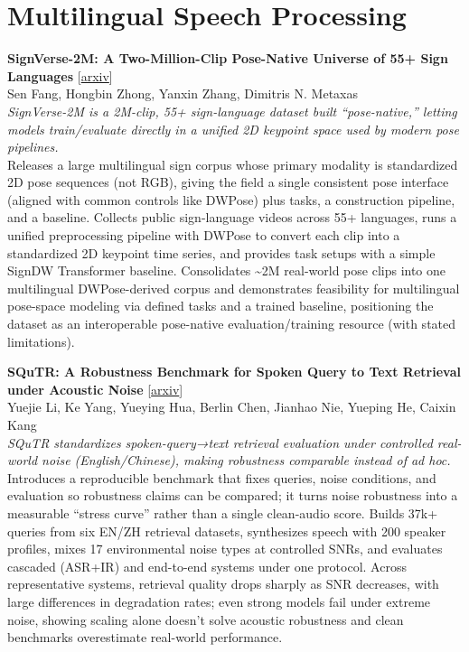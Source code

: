 \documentclass[12pt,letterpaper]{article}
\begin{document}
\medskip


\section*{Multilingual Speech Processing}

{\small\textbf{SignVerse-2M: A Two-Million-Clip Pose-Native Universe of 55+ Sign Languages}} {\scriptsize[\href{https://arxiv.org/abs/2605.01720}{arxiv}]}\\
{\scriptsize Sen Fang, Hongbin Zhong, Yanxin Zhang, Dimitris N. Metaxas}\\

{\small\textit{SignVerse-2M is a 2M-clip, 55+ sign-language dataset built ``pose-native,'' letting models train/evaluate directly in a unified 2D keypoint space used by modern pose pipelines.}}\\[1pt]
{\footnotesize Releases a large multilingual sign corpus whose primary modality is standardized 2D pose sequences (not RGB), giving the field a single consistent pose interface (aligned with common controls like DWPose) plus tasks, a construction pipeline, and a baseline. Collects public sign-language videos across 55+ languages, runs a unified preprocessing pipeline with DWPose to convert each clip into a standardized 2D keypoint time series, and provides task setups with a simple SignDW Transformer baseline. Consolidates \textasciitilde{}2M real-world pose clips into one multilingual DWPose-derived corpus and demonstrates feasibility for multilingual pose-space modeling via defined tasks and a trained baseline, positioning the dataset as an interoperable pose-native evaluation/training resource (with stated limitations).}

\medskip

{\small\textbf{SQuTR: A Robustness Benchmark for Spoken Query to Text Retrieval under Acoustic Noise}} {\scriptsize[\href{https://arxiv.org/abs/2602.12783}{arxiv}]}\\
{\scriptsize Yuejie Li, Ke Yang, Yueying Hua, Berlin Chen, Jianhao Nie, Yueping He, Caixin Kang}\\

{\small\textit{SQuTR standardizes spoken-query→text retrieval evaluation under controlled real-world noise (English/Chinese), making robustness comparable instead of ad hoc.}}\\[1pt]
{\footnotesize Introduces a reproducible benchmark that fixes queries, noise conditions, and evaluation so robustness claims can be compared; it turns noise robustness into a measurable ``stress curve'' rather than a single clean-audio score. Builds 37k+ queries from six EN/ZH retrieval datasets, synthesizes speech with 200 speaker profiles, mixes 17 environmental noise types at controlled SNRs, and evaluates cascaded (ASR+IR) and end-to-end systems under one protocol. Across representative systems, retrieval quality drops sharply as SNR decreases, with large differences in degradation rates; even strong models fail under extreme noise, showing scaling alone doesn't solve acoustic robustness and clean benchmarks overestimate real-world performance.}
\end{document}
